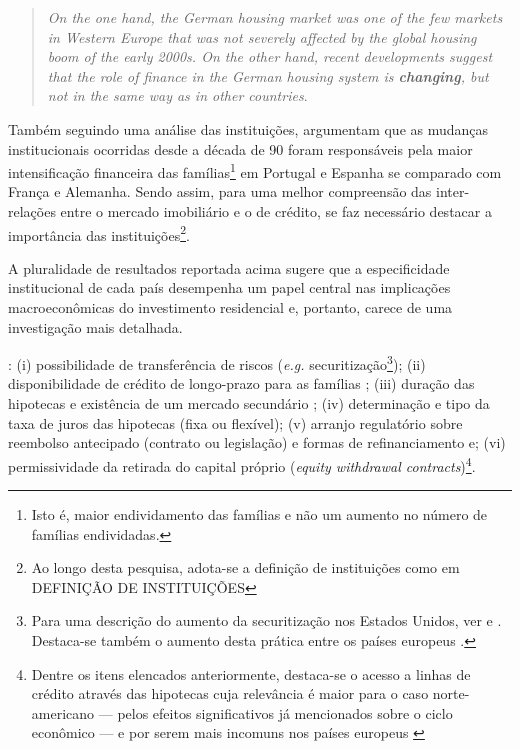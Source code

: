 \begin{quote}
	\textit{On the one hand, the German housing
		market was one of the few markets in Western Europe that was not severely affected by the
		global housing boom of the early 2000s. On the other hand, recent developments suggest
		that the role of finance in the German housing system is \textbf{changing}, but not in the same way as
		in other countries}. \cite[p.~969, grifos adicionados]{wijburg_alternative_2017}
\end{quote}
Também seguindo uma análise das instituições, \textcite{van_gunten_varieties_2018} argumentam que as mudanças institucionais ocorridas desde a década de 90 foram responsáveis pela maior intensificação financeira das famílias\footnote{Isto é, maior endividamento das famílias e não um aumento no número de famílias endividadas.} em Portugal e Espanha se comparado com França e Alemanha. Sendo assim, para uma melhor compreensão das inter-relações entre o mercado imobiliário e o de crédito, se faz necessário destacar a importância das instituições\footnote{
	Ao longo desta pesquisa, adota-se a definição de instituições como em 	DEFINIÇÃO DE INSTITUIÇÕES}.  



A pluralidade de resultados reportada acima sugere que a especificidade institucional de cada país desempenha um papel central nas implicações macroeconômicas do investimento residencial e, portanto, carece de uma investigação mais detalhada.





: (i) possibilidade de transferência de riscos (\textit{e.g.} securitização\footnote{Para uma descrição do aumento da securitização nos Estados Unidos, ver \textcite{green_american_2005} e \textcite{cagnin_o_2009}. Destaca-se também o aumento desta prática entre os países europeus \cite{european_central_bank_housing_2010}.}); (ii) disponibilidade de crédito de longo-prazo para as famílias \cite{schwartz_politics_2009}; (iii) duração das hipotecas e existência de um mercado secundário \cite{green_american_2005}; (iv) determinação  e tipo da taxa de juros das hipotecas (fixa ou flexível); (v) arranjo regulatório sobre reembolso antecipado (contrato ou legislação) e formas de refinanciamento e; (vi) permissividade da retirada do capital próprio (\textit{equity withdrawal contracts})\footnote{Dentre os itens elencados anteriormente, destaca-se o acesso a linhas de crédito através das hipotecas cuja relevância é maior para o caso norte-americano --- pelos efeitos significativos já mencionados sobre o ciclo econômico --- e por serem mais incomuns nos países europeus \cite[p.~95]{van_gunten_varieties_2018}}.

